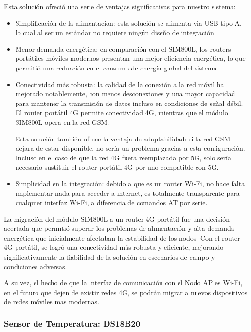 Esta solución ofreció una serie de ventajas significativas para nuestro sistema:

\begin{itemize}
    \item Simplificación de la alimentación: esta solución se alimenta via USB tipo A, lo cual al ser un estándar no requiere ningún diseño de integración.
    
    \item Menor demanda energética: en comparación con el SIM800L, los routers portátiles móviles modernos presentan una mejor eficiencia energética, lo que permitió una reducción en el consumo de energía global del sistema.
    
    \item Conectividad más robusta: la calidad de la conexión a la red móvil ha mejorado notablemente, con menos desconexiones y una mayor capacidad para mantener la transmisión de datos incluso en condiciones de señal débil. El router portátil 4G permite conectividad 4G, mientras que el módulo SIM800L opera en la red GSM.
    
    Esta solución también ofrece la ventaja de adaptabilidad: si la red GSM dejara de estar disponible, no sería un problema gracias a esta configuración. Incluso en el caso de que la red 4G fuera reemplazada por 5G, solo sería necesario sustituir el router portátil 4G por uno compatible con 5G.
    
    \item Simplicidad en la integración: debido a que es un router Wi-Fi, no hace falta implementar nada para acceder a internet, es totalmente transparente para cualquier interfaz Wi-Fi, a diferencia de comandos AT por serie.
\end{itemize}

La migración del módulo SIM800L a un router 4G portátil fue una decisión acertada que permitió superar los problemas de alimentación y alta demanda energética que inicialmente afectaban la estabilidad de los nodos. Con el router 4G portátil, se logró una conectividad más robusta y eficiente, mejorando significativamente la fiabilidad de la solución en escenarios de campo y condiciones adversas.

A su vez, el hecho de que la interfaz de comunicación con el Nodo AP es Wi-Fi, en el futuro que dejen de existir redes 4G, se podrán migrar a nuevos dispositivos de redes móviles mas modernas.


\subsubsection{Sensor de Temperatura: DS18B20}

